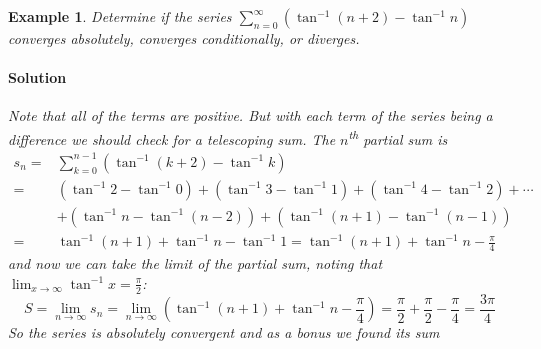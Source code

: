 \documentclass[letterpaper, 11pt, openany]{book}
\theoremstyle{mytheoremstyle}
\theoremstyle{myexamplestyle}
\newtheorem{example}{Example}[section]
\newenvironment{solution}{\paragraph{\sffamily \smaller \fontseries{b}\selectfont Solution}}{\hfill\faSquare}
\begin{document}
\begin{example}\label{e:seriestestsinvtan}
    Determine if the series $\displaystyle \sum_{n=0}^{\infty} \left( \tan^{-1}(n+2) - \tan^{-1} n \right)$ converges absolutely, converges conditionally, or diverges.
    \begin{solution}
        Note that all of the terms are positive. But with each term of the series being a difference we should check for a telescoping sum. The $n$\textsuperscript{th} partial sum is        
        \begin{align*}            
                s_{n}   {}={}   &\sum_{k = 0}^{n-1} \left( \tan^{-1}(k+2) - \tan^{-1} k \right)\\
                        {}={}   &\left( \tan^{-1} 2 - \tan^{-1} 0 \right) + \left( \tan^{-1} 3 - \tan^{-1} 1 \right) + \left( \tan^{-1} 4 - \tan^{-1} 2\right) + \cdots\\
                                & + \left( \tan^{-1}  n  - \tan^{-1} \left( n - 2 \right) \right) + \left( \tan^{-1} \left( n + 1 \right) - \tan^{-1} \left( n - 1 \right) \right)\\
                        {}={}   &\tan^{-1} \left( n + 1 \right) + \tan^{-1}  n - \tan^{-1} 1 = \tan^{-1} \left( n + 1 \right) + \tan^{-1}  n - \frac{\pi}{4}
        \end{align*}
        and now we can take the limit of the partial sum, noting that $\displaystyle \lim_{x \to \infty} \tan^{-1} x = \frac{\pi}{2}$:
        \[S = \lim_{n \to \infty} s_{n} = \lim_{n \to \infty} \left(  \tan^{-1} \left( n + 1 \right) + \tan^{-1}  n - \frac{\pi}{4} \right) = \frac{\pi}{2} + \frac{\pi}{2} - \frac{\pi}{4} = \frac{3\pi}{4}\]
        So the series is absolutely convergent and as a bonus we found its sum \faSmile
     \end{solution}
\end{example}
\end{document}
